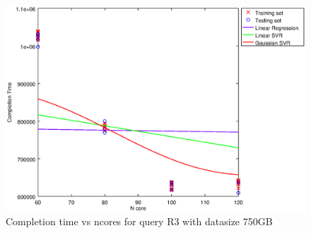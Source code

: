 
\begin {figure}[hbtp]
\centering
\includegraphics[width=\textwidth]{output/R3_750_LINEAR_NCORE/plot_R3_750_bestmodels.eps}
\caption{Completion time vs ncores for query R3 with datasize 750GB}
\label{fig:coreonly_linear_R3_750}
\end {figure}
